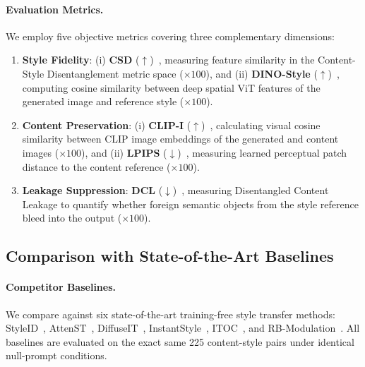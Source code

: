 \paragraph{Evaluation Metrics.}
We employ five objective metrics covering three complementary dimensions:
\begin{enumerate}
    \item \textbf{Style Fidelity}: (i) \textbf{CSD} ($\uparrow$)~\cite{csd2024}, measuring feature similarity in the Content-Style Disentanglement metric space ($\times 100$), and (ii) \textbf{DINO-Style} ($\uparrow$)~\cite{caron2021emerging}, computing cosine similarity between deep spatial ViT features of the generated image and reference style ($\times 100$).
    \item \textbf{Content Preservation}: (i) \textbf{CLIP-I} ($\uparrow$)~\cite{radford2021learning}, calculating visual cosine similarity between CLIP image embeddings of the generated and content images ($\times 100$), and (ii) \textbf{LPIPS} ($\downarrow$)~\cite{zhang2018perceptual}, measuring learned perceptual patch distance to the content reference ($\times 100$).
    \item \textbf{Leakage Suppression}: \textbf{DCL} ($\downarrow$)~\cite{rout2024rbmodulation}, measuring Disentangled Content Leakage to quantify whether foreign semantic objects from the style reference bleed into the output ($\times 100$).
\end{enumerate}

\subsection{Comparison with State-of-the-Art Baselines}

\paragraph{Competitor Baselines.}
We compare \method against six state-of-the-art training-free style transfer methods: StyleID~\cite{dinh2024styleid}, AttenST~\cite{attenst2024}, DiffuseIT~\cite{kwon2023diffuseit}, InstantStyle~\cite{wang2024instantstyle}, ITOC~\cite{itoc2024}, and RB-Modulation~\cite{rout2024rbmodulation}. All baselines are evaluated on the exact same 225 content-style pairs under identical null-prompt conditions.

